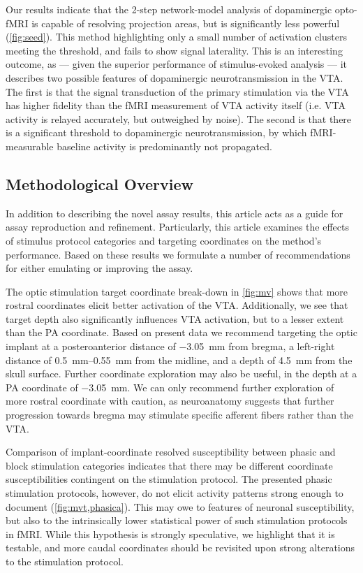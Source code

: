 Our results indicate that the 2-step network-model analysis of dopaminergic opto-fMRI is capable of resolving projection areas, but is significantly less powerful (\cref{fig:seed}).
This method highlighting only a small number of activation clusters meeting the threshold, and fails to show signal laterality.
This is an interesting outcome, as --- given the superior performance of stimulus-evoked analysis --- it describes two possible features of dopaminergic neurotransmission in the VTA.
The first is that the signal transduction of the primary stimulation via the VTA has higher fidelity than the fMRI measurement of VTA activity itself (i.e. VTA activity is relayed accurately, but outweighed by noise).
The second is that there is a significant threshold to dopaminergic neurotransmission, by which fMRI-measurable baseline activity is predominantly not propagated.

\subsection{Methodological Overview}

In addition to describing the novel assay results, this article acts as a guide for assay reproduction and refinement.
Particularly, this article examines the effects of stimulus protocol categories and targeting coordinates on the method's performance.
Based on these results we formulate a number of recommendations for either emulating or improving the assay.

The optic stimulation target coordinate break-down in \cref{fig:mv} shows that more rostral coordinates elicit better activation of the VTA.
Additionally, we see that target depth also significantly influences VTA activation, but to a lesser extent than the PA coordinate.
Based on present data we recommend targeting the optic implant at
a posteroanterior distance of \SI{-3.05}{\milli\meter} from bregma,
a left-right distance of \SIrange{0.5}{0.55}{\milli\meter} from the midline,
and a depth of \SI{4.5}{\milli\meter} from the skull surface.
Further coordinate exploration may also be useful, in the depth at a PA coordinate of \SI{-3.05}{\milli\meter}.
We can only recommend further exploration of more rostral coordinate with caution, as neuroanatomy suggests that further progression towards bregma may stimulate specific afferent fibers rather than the VTA.

Comparison of implant-coordinate resolved susceptibility between phasic and block stimulation categories indicates that there may be different coordinate susceptibilities contingent on the stimulation protocol.
The presented phasic stimulation protocols, however, do not elicit activity patterns strong enough to document (\cref{fig:mvt,phasica}).
This may owe to features of neuronal susceptibility, but also to the intrinsically lower statistical power of such stimulation protocols in fMRI.
While this hypothesis is strongly speculative, we highlight that it is testable, and more caudal coordinates should be revisited upon strong alterations to the stimulation protocol.

